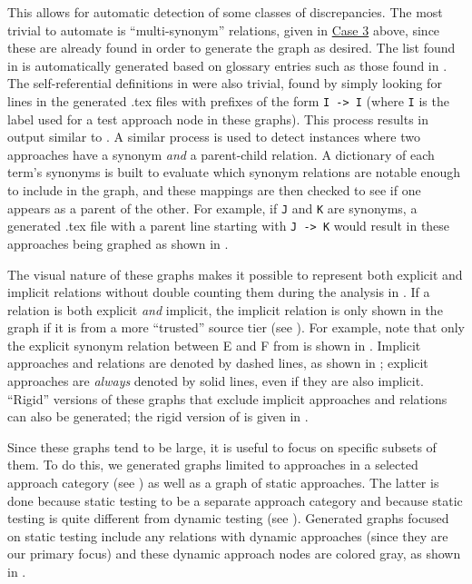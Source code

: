     This allows for automatic detection of some classes of discrepancies. The
    most trivial to automate is ``multi-synonym'' relations, given in
    \hyperref[case-three]{Case 3} above, since these are already found in order
    to generate the graph as desired. The list found in 
    is automatically generated based on glossary entries such as those found
    in . The self-referential definitions in
     were also trivial, found by simply looking for lines in
    the generated .tex files with prefixes of the form \texttt{I -> I} (where
    \texttt{I} is the label used for a test approach node in these graphs).
    This process results in output similar to . A
    similar process is used to detect instances where two approaches have a
    synonym \emph{and} a parent-child relation. A dictionary of each term's
    synonyms is built to evaluate which synonym relations are notable
    enough to include in the graph, and these mappings are then checked to
    see if one appears as a parent of the other. For example, if \texttt{J}
    and \texttt{K} are synonyms, a generated .tex file with a parent line
    starting with \texttt{J -> K} would result in these approaches being
    graphed as shown in .

    The visual nature of these graphs makes it possible to represent both
    explicit and implicit relations without double counting them during the
    analysis in . If a relation is both explicit
    \emph{and} implicit, the implicit relation is only shown in the graph
    if it is from a more ``trusted'' source tier (see ).
    For example, note that only the explicit synonym relation between E and F
    from  is shown in .
    Implicit approaches and relations are denoted by dashed lines, as shown
    in ; explicit approaches are
    \emph{always} denoted by solid lines, even if they are also implicit.
    ``Rigid'' versions of these graphs that exclude implicit approaches and
    relations can also be generated; the rigid version of
     is given in .

\fi
Since these graphs tend to be large, it is useful to focus on specific
subsets of them. \ifnotpaper To do this, we generated graphs limited to
    approaches in a selected approach category (see )
    as well as a graph of static approaches. The latter is done because
    \citet[Fig.~2]{IEEE2022}  static testing to be a
    separate approach category and because static testing is quite different
    from dynamic testing (see ). Generated graphs focused
    on static testing include any relations with dynamic approaches (since
    they are our primary focus) and these dynamic approach nodes are
    colored gray, as shown in .


